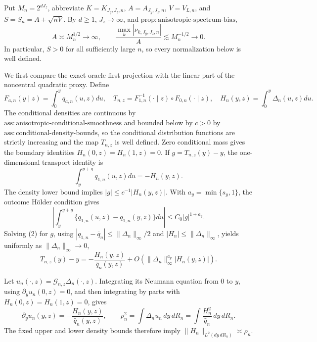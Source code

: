 Put \(M_n=2^{dJ_z}\), abbreviate \(K=K_{J_y,J_z,n}\), \(A=A_{J_y,J_z,n}\), \(V=V_{L,n}\), and \(S=S_n=A+\sqrt{nV}\). By \(d\ge1\), \(J_z\to\infty\), and \(\mathrm{prop{:}anisotropic\text{-}spectrum\text{-}bias}\),
\[
A\asymp M_n^{1/2}\longrightarrow\infty,
\qquad
\frac{\max_k|\nu_{k,J_y,J_z,n}|}{A}
\lesssim M_n^{-1/2}\longrightarrow0. \tag{1}
\]
In particular, \(S>0\) for all sufficiently large \(n\), so every normalization below is well defined.

We first compare the exact oracle first projection with the linear part of the noncentral quadratic proxy. Define
\[
F_{a,n}(y\mid z)=\int_0^yq_{a,n}(u,z)du,
\quad
T_{n,z}=F_{1,n}^{-1}(\cdot\mid z)\circ F_{0,n}(\cdot\mid z),
\quad
H_n(y,z)=\int_0^y\Delta_n(u,z)du.
\]
The conditional densities are continuous by \(\mathrm{ass{:}anisotropic\text{-}conditional\text{-}smoothness}\) and bounded below by \(c>0\) by \(\mathrm{ass{:}conditional\text{-}density\text{-}bounds}\), so the conditional distribution functions are strictly increasing and the map \(T_{n,z}\) is well defined. Zero conditional mass gives the boundary identities \(H_n(0,z)=H_n(1,z)=0\). If \(g=T_{n,z}(y)-y\), the one-dimensional transport identity is
\[
\int_y^{y+g}q_{1,n}(u,z)du=-H_n(y,z). \tag{2}
\]
The density lower bound implies \(|g|\le c^{-1}|H_n(y,z)|\). With \(a_y=\min\{s_y,1\}\), the outcome H\"older condition gives
\[
\left|\int_y^{y+g}\{q_{1,n}(u,z)-q_{1,n}(y,z)\}du\right|
\le C_0|g|^{1+a_y}.
\]
Solving (2) for \(g\), using \(|q_{1,n}-\bar q_n|\le\|\Delta_n\|_\infty/2\) and \(|H_n|\le\|\Delta_n\|_\infty\), yields uniformly as \(\|\Delta_n\|_\infty\to0\),
\[
T_{n,z}(y)-y
=-\frac{H_n(y,z)}{\bar q_n(y,z)}
+O\!\left(\|\Delta_n\|_\infty^{a_y}|H_n(y,z)|\right). \tag{3}
\]

Let \(u_n(\cdot,z)=\mathcal G_{n,z}\Delta_n(\cdot,z)\). Integrating its Neumann equation from \(0\) to \(y\), using \(\partial_yu_n(0,z)=0\), and then integrating by parts with \(H_n(0,z)=H_n(1,z)=0\), gives
\[
\partial_yu_n(y,z)=-\frac{H_n(y,z)}{\bar q_n(y,z)},
\qquad
\rho_n^2=\int\Delta_nu_n\,dy\,dR_n
=\int\frac{H_n^2}{\bar q_n}\,dy\,dR_n. \tag{4}
\]
The fixed upper and lower density bounds therefore imply \(\|H_n\|_{L^2(dy\,dR_n)}\asymp\rho_n\).

